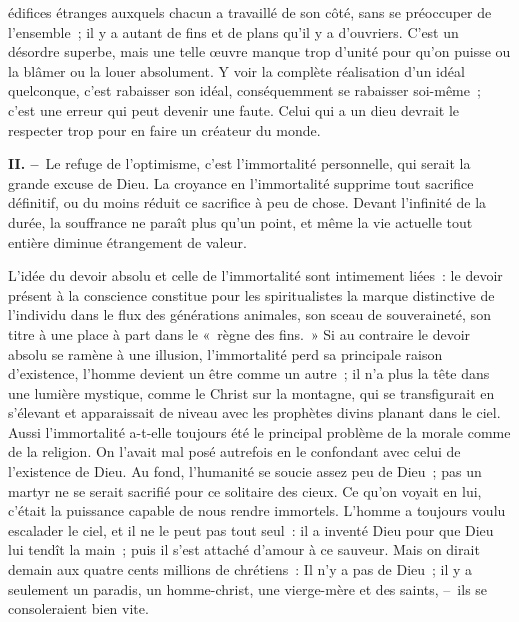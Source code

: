 \documentclass[french,twoside]{book} %
\begin{document}
édifices étranges auxquels chacun a travaillé de son côté, sans se préoccuper de l’ensemble ; il y a autant de fins et de plans qu’il y a d’ouvriers. C’est un désordre superbe, mais une telle œuvre manque trop d’unité pour qu’on puisse ou la blâmer ou la louer absolument. Y voir la complète réalisation d’un idéal quelconque, c’est rabaisser son idéal, conséquemment se rabaisser soi-même ; c’est une erreur qui peut devenir une faute. Celui qui a un dieu devrait le respecter trop pour en faire un créateur du monde. \\
\par
\textbf{II. –} Le refuge de l’optimisme, c’est l’immortalité personnelle, qui serait la grande excuse de Dieu. La croyance en l’immortalité supprime tout sacrifice définitif, ou du moins réduit ce sacrifice à peu de chose. Devant l’infinité de la durée, la souffrance ne paraît plus qu’un point, et même la vie actuelle tout entière diminue étrangement de valeur.\par
L’idée du devoir absolu et celle de l’immortalité sont intimement liées : le devoir présent à la conscience constitue pour les spiritualistes la marque distinctive de l’individu dans le flux des générations animales, son sceau de souveraineté, son titre à une place à part dans le « règne des fins. » Si au contraire le devoir absolu se ramène à une illusion, l’immortalité perd sa principale raison d’existence, l’homme devient un être comme un autre ; il n’a plus la tête dans une lumière mystique, comme le Christ sur la montagne, qui se transfigurait en s’élevant et apparaissait de niveau avec les prophètes divins planant dans le ciel. Aussi l’immortalité a-t-elle toujours été le principal problème de la morale comme de la religion. On l’avait mal posé autrefois en le confondant avec celui de l’existence de Dieu. Au fond, l’humanité se soucie assez peu de Dieu ; pas un martyr ne se serait sacrifié pour ce solitaire des cieux. Ce qu’on voyait en lui, c’était la puissance capable de nous rendre immortels. L’homme a toujours voulu escalader le ciel, et il ne le peut pas tout seul : il a inventé Dieu pour que Dieu lui tendît la main ; puis il s’est attaché d’amour à ce sauveur. Mais on dirait demain aux quatre cents millions de chrétiens : Il n’y a pas de Dieu ; il y a seulement un paradis, un homme-christ, une vierge-mère et des saints, – ils se consoleraient bien vite.\par
\end{document}

